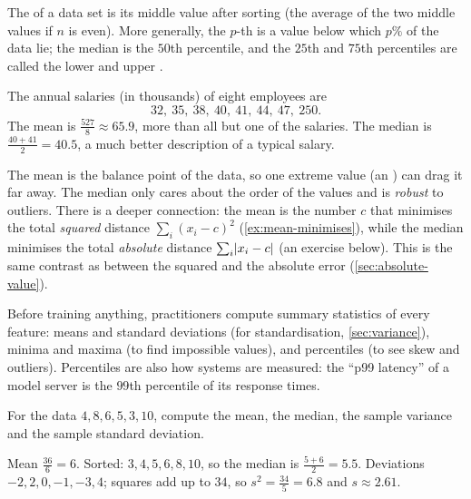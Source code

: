 \begin{definition}\label{def:median}
The  of a data set is its middle value after sorting (the average
of the two middle values if $n$ is even). More generally, the
$p$-th  is a value below which $p\%$ of the data lie; the
median is the $50$th percentile, and the $25$th and $75$th percentiles are
called the lower and upper .
\end{definition}

\begin{example}\label{ex:mean-median}
The annual salaries (in thousands) of eight employees are
\[
  32,\ 35,\ 38,\ 40,\ 41,\ 44,\ 47,\ 250 .
\]
The mean is $\frac{527}{8} \approx 65.9$, more than all but one of the salaries.
The median is $\frac{40 + 41}{2} = 40.5$, a much better description of a typical
salary.
\end{example}

\begin{intuition}
The mean is the balance point of the data, so one extreme value (an
) can drag it far away. The median only cares about the order of
the values and is \emph{robust} to outliers. There is a deeper connection: the
mean is the number $c$ that minimises the total \emph{squared} distance
$\sum_i(x_i - c)^2$ (\cref{ex:mean-minimises}), while the median minimises the
total \emph{absolute} distance $\sum_i\lvert x_i - c\rvert$ (an exercise below). This is
the same contrast as between the squared and the absolute error
(\cref{sec:absolute-value}).
\end{intuition}

\begin{mlnote}
Before training anything, practitioners compute summary statistics of every
feature: means and standard deviations (for standardisation,
\cref{sec:variance}), minima and maxima (to find impossible values), and
percentiles (to see skew and outliers). Percentiles are also how systems are
measured: the ``p99 latency'' of a model server is the $99$th percentile of its
response times.
\end{mlnote}

\sectionexercises

\begin{exercise}
For the data $4, 8, 6, 5, 3, 10$, compute the mean, the median, the sample
variance and the sample standard deviation.
\end{exercise}
\begin{solution}
Mean $\tfrac{36}{6} = 6$. Sorted: $3, 4, 5, 6, 8, 10$, so the median is
$\tfrac{5 + 6}{2} = 5.5$. Deviations $-2, 2, 0, -1, -3, 4$; squares add up to
$34$, so $s^2 = \tfrac{34}{5} = 6.8$ and $s \approx 2.61$.
\end{solution}

